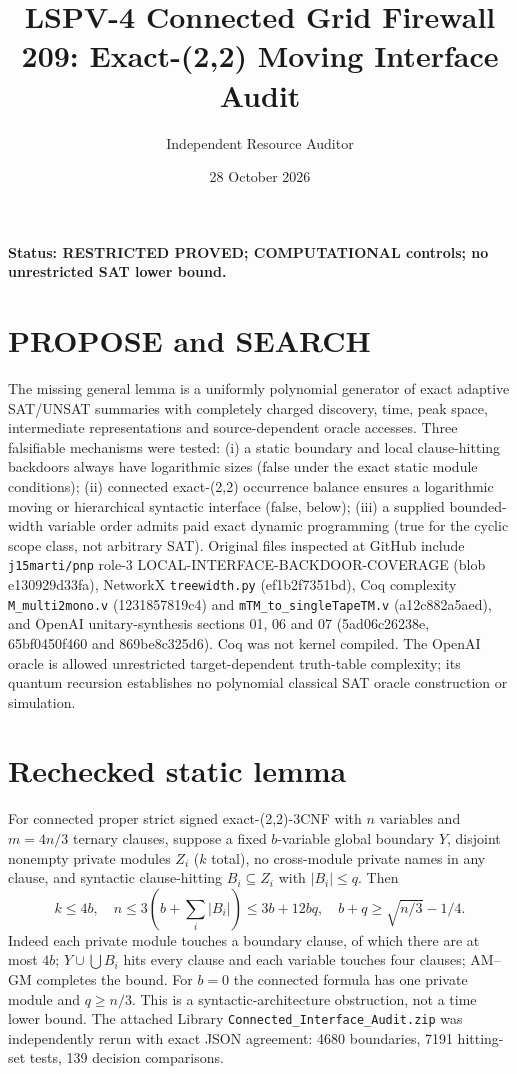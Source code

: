 \documentclass[11pt]{article}
\title{LSPV-4 Connected Grid Firewall 209: Exact-(2,2) Moving Interface Audit}
\author{Independent Resource Auditor}
\date{28 October 2026}
\begin{document}
\maketitle
\noindent\textbf{Status: RESTRICTED PROVED; COMPUTATIONAL controls; no unrestricted SAT lower bound.}
\section{PROPOSE and SEARCH}
The missing general lemma is a uniformly polynomial generator of exact adaptive SAT/UNSAT summaries with completely charged discovery, time, peak space, intermediate representations and source-dependent oracle accesses. Three falsifiable mechanisms were tested: (i) a static boundary and local clause-hitting backdoors always have logarithmic sizes (false under the exact static module conditions); (ii) connected exact-(2,2) occurrence balance ensures a logarithmic moving or hierarchical syntactic interface (false, below); (iii) a supplied bounded-width variable order admits paid exact dynamic programming (true for the cyclic scope class, not arbitrary SAT).
Original files inspected at GitHub include \texttt{j15marti/pnp} role-3 LOCAL-INTERFACE-BACKDOOR-COVERAGE (blob e130929d33fa), NetworkX \texttt{treewidth.py} (ef1b2f7351bd), Coq complexity \texttt{M\_multi2mono.v} (1231857819c4) and \texttt{mTM\_to\_singleTapeTM.v} (a12c882a5aed), and OpenAI unitary-synthesis sections 01, 06 and 07 (5ad06c26238e, 65bf0450f460 and 869be8c325d6). Coq was not kernel compiled. The OpenAI oracle is allowed unrestricted target-dependent truth-table complexity; its quantum recursion establishes no polynomial classical SAT oracle construction or simulation.
\section{Rechecked static lemma}
For connected proper strict signed exact-(2,2)-3CNF with $n$ variables and $m=4n/3$ ternary clauses, suppose a fixed $b$-variable global boundary $Y$, disjoint nonempty private modules $Z_i$ ($k$ total), no cross-module private names in any clause, and syntactic clause-hitting $B_i\subseteq Z_i$ with $|B_i|\le q$. Then
\[
k\le4b,\quad n\le3(b+\sum_i|B_i|)\le3b+12bq,\quad b+q\ge\sqrt{n/3}-1/4.
\]
Indeed each private module touches a boundary clause, of which there are at most $4b$; $Y\cup\bigcup B_i$ hits every clause and each variable touches four clauses; AM--GM completes the bound. For $b=0$ the connected formula has one private module and $q\ge n/3$. This is a syntactic-architecture obstruction, not a time lower bound. The attached Library \texttt{Connected\_Interface\_Audit.zip} was independently rerun with exact JSON agreement: 4680 boundaries, 7191 hitting-set tests, 139 decision comparisons.
\end{document}
